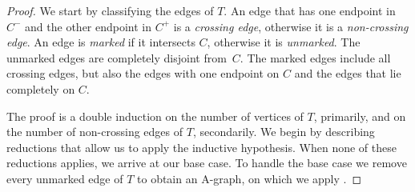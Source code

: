 \begin{proof}
  We start by classifying the edges of $T$.  An edge that has one
  endpoint in $C^-$ and the other endpoint in $C^+$ is a \emph{crossing
    edge}, otherwise it is a \emph{non-crossing edge}.  An edge
  is \emph{marked} if it intersects $C$, otherwise it is
  \emph{unmarked}.  The unmarked edges are completely disjoint
  from~$C$.  The marked edges include all crossing edges, but also the
  edges with one endpoint on $C$ and the edges that lie completely on
  $C$.
	
	
	
	The proof is a double induction on the number of vertices of $T$, primarily, and on the number of non-crossing edges of $T$, secondarily.
	We begin by describing reductions that allow us to apply the
	inductive hypothesis. When none of these reductions applies,
	we arrive at our base case. To handle the base case 
	we remove every unmarked edge of $T$ to obtain an A-graph, on which we
	apply .


\end{proof}
